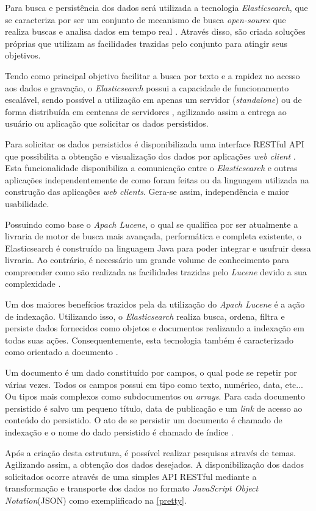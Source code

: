 Para busca e persistência dos dados será utilizada a tecnologia \textit{Elasticsearch}, que se caracteriza por ser um conjunto de mecanismo de busca \textit{open-source} que realiza buscas e analisa dados em tempo real \cite{Gil:2010}. Através disso, são criada soluções próprias que utilizam as  facilidades trazidas pelo conjunto para atingir seus objetivos.

Tendo como principal objetivo facilitar a busca por texto e a rapidez no acesso aos dados e gravação, o \textit{Elasticsearch} possui a capacidade de funcionamento escalável, sendo possível a utilização em apenas um servidor (\textit{standalone}) ou de forma distribuída em centenas de servidores \cite{Gormley:2015}, agilizando assim a entrega ao usuário ou aplicação que solicitar os dados persistidos.

Para solicitar os dados persistidos é disponibilizada uma interface RESTful API que possibilita a obtenção e visualização dos dados por aplicações \textit{web client} \cite{Gormley:2015}. Esta funcionalidade disponibiliza a comunicação entre o \textit{Elasticsearch} e outras aplicações independentemente de como foram feitas ou da linguagem utilizada na construção das aplicações \textit{web clients}. Gera-se assim, independência e maior usabilidade.

Possuindo como base o \textit{Apach Lucene}, o qual se qualifica por ser atualmente a livraria de motor de busca mais avançada, performática e completa  existente, o Elasticsearch é construído na linguagem Java para poder integrar e usufruir dessa livraria. Ao contrário, é necessário um grande volume de conhecimento para compreender como são realizada as facilidades trazidas pelo \textit{Lucene} devido a sua complexidade \cite{Gormley:2015}.

Um dos maiores benefícios trazidos pela da utilização do \textit{Apach Lucene} é a ação de indexação. Utilizando isso, o \textit{Elasticsearch} realiza busca, ordena, filtra e persiste dados fornecidos como objetos e documentos realizando a indexação em todas suas ações. Consequentemente, esta tecnologia também é caracterizado como orientado a documento \cite{Gormley:2015}.

Um documento é um dado constituído por campos, o qual pode se repetir por várias vezes. Todos os campos possui em tipo como texto, numérico, data, etc... Ou tipos mais complexos como subdocumentos ou \textit{arrays}. Para cada documento persistido é salvo um pequeno título, data de publicação e um \textit{link} de acesso ao conteúdo do persistido. O ato de se persistir um documento é chamado de indexação e o nome do dado persistido é chamado de índice \cite{Kuc:2013}.

Após a criação desta estrutura, é possível realizar pesquisas através de temas. Agilizando assim, a obtenção dos dados desejados. A disponibilização dos dados solicitados ocorre através de uma simples API RESTful mediante a transformação e transporte dos dados no formato \textit{JavaScript Object Notation}(JSON) como exemplificado na \autoref{pretty}.
